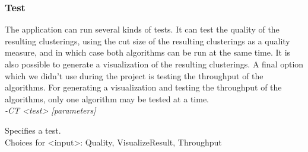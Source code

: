 \documentclass[a4paper]{article}
\begin{document}
\subsubsection{Test}
The application can run several kinds of tests. It can test the quality of the resulting clusterings, using the cut size of the resulting clusterings as a quality measure, and in which case both algorithms can be run at the same time. It is also possible to generate a visualization of the resulting clusterings. A final option which we didn't use during the project is testing the throughput of the algorithms. For generating a visualization and testing the throughput of the algorithms, only one algorithm may be tested at a time.\\

\emph{-CT <test> [parameters]}

Specifies a test. \\
Choices for <input>: Quality, VisualizeResult, Throughput
\end{document}
